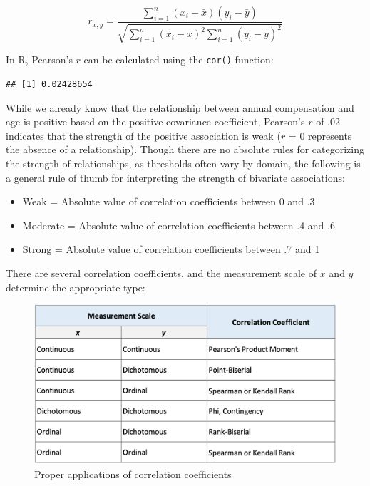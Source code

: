 \documentclass[
]{book}
\newenvironment{Shaded}{\begin{snugshade}}{\end{snugshade}}
\newcommand{\AttributeTok}[1]{\textcolor[rgb]{0.77,0.63,0.00}{#1}}
\newcommand{\CommentTok}[1]{\textcolor[rgb]{0.56,0.35,0.01}{\textit{#1}}}
\newcommand{\FunctionTok}[1]{\textcolor[rgb]{0.00,0.00,0.00}{#1}}
\newcommand{\NormalTok}[1]{#1}
\newcommand{\SpecialCharTok}[1]{\textcolor[rgb]{0.00,0.00,0.00}{#1}}
\newcommand{\StringTok}[1]{\textcolor[rgb]{0.31,0.60,0.02}{#1}}
\providecommand{\tightlist}{%
  \setlength{\itemsep}{0pt}\setlength{\parskip}{0pt}}
\begin{document}
\[ r_{x,y} = \frac{\displaystyle\sum_{i=1}^{n} (x_{i}-\bar{x})(y_{i}-\bar{y})}{\sqrt{\displaystyle\sum_{i=1}^{n} (x_{i}-\bar{x})^2 \displaystyle\sum_{i=1}^{n} (y_{i}-\bar{y})^2}} \]

In R, Pearson's \(r\) can be calculated using the \texttt{cor()} function:

\begin{Shaded}
\end{Shaded}

\begin{verbatim}
## [1] 0.02428654
\end{verbatim}

While we already know that the relationship between annual compensation and age is positive based on the positive covariance coefficient, Pearson's \(r\) of .02 indicates that the strength of the positive association is weak (\(r\) = 0 represents the absence of a relationship). Though there are no absolute rules for categorizing the strength of relationships, as thresholds often vary by domain, the following is a general rule of thumb for interpreting the strength of bivariate associations:

\begin{itemize}
\tightlist
\item
  Weak = Absolute value of correlation coefficients between 0 and .3
\item
  Moderate = Absolute value of correlation coefficients between .4 and .6
\item
  Strong = Absolute value of correlation coefficients between .7 and 1
\end{itemize}

There are several correlation coefficients, and the measurement scale of \(x\) and \(y\) determine the appropriate type:

\begin{figure}

{\centering \includegraphics[width=1\linewidth]{graphics/correlation_table} 

}

\caption{Proper applications of correlation coefficients}\label{fig:corr-table}
\end{figure}
\end{document}
